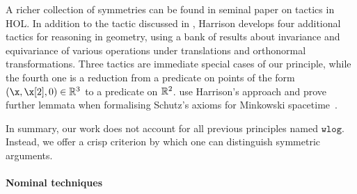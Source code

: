A richer collection of symmetries can be found in
 seminal paper on \WLOG tactics in
HOL. In addition to the tactic discussed in , Harrison develops four additional tactics for \WLOG{}
reasoning in geometry, using a bank of results about invariance and
equivariance of various operations under translations and orthonormal
transformations. Three tactics are immediate special cases of our
principle, while the fourth one is a reduction from a predicate on
points of the form $(\x,\y,0) \in \reals^3$ to a predicate on
$\mathbb{R}^2$. \citet{schmoetten-palmer-fleuriot:formalising-geometric-axioms-for-minkowski-spacetime-and-without-loss-of-generality-theorems,%
schmoetten-palmer-fleuriot:towards-formalising-schutz-axioms-for-minkowski-spacetime-in-isabelle-hol%
} use Harrison's approach and prove further \WLOG{} lemmata when
formalising Schutz's axioms for Minkowski
spacetime~\cite{schutz:independent-axioms-for-Minkowski-space-time}.

In summary, our work does not account for all
previous principles named $\mathtt{wlog}$. Instead, we offer a crisp
criterion by which one can distinguish symmetric \WLOG{} arguments.

\paragraph{Nominal techniques}

